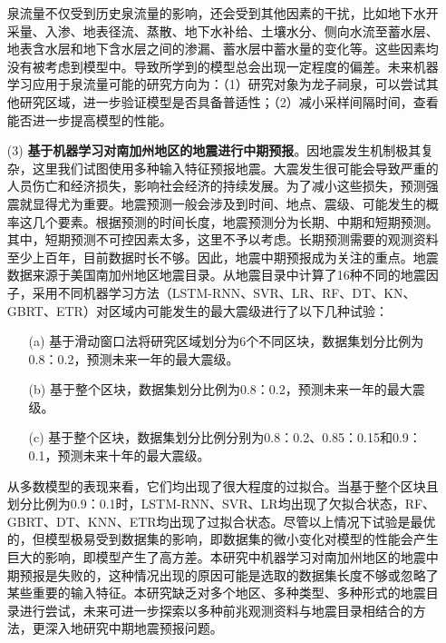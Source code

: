 \begin{enumerate}
  泉流量不仅受到历史泉流量的影响，还会受到其他因素的干扰，比如地下水开采量、入渗、地表径流、蒸散、地下水补给、土壤水分、侧向水流至蓄水层、地表含水层和地下含水层之间的渗漏、蓄水层中蓄水量的变化等。这些因素均没有被考虑到模型中。导致所学到的模型总会出现一定程度的偏差。未来机器学习应用于泉流量可能的研究方向为：（1）研究对象为龙子祠泉，可以尝试其他研究区域，进一步验证模型是否具备普适性；（2）减小采样间隔时间，查看能否进一步提高模型的性能。

  \item[(3)] \textbf{基于机器学习对南加州地区的地震进行中期预报}。因地震发生机制极其复杂，这里我们试图使用多种输入特征预报地震。大震发生很可能会导致严重的人员伤亡和经济损失，影响社会经济的持续发展。为了减小这些损失，预测强震就显得尤为重要。地震预测一般会涉及到时间、地点、震级、可能发生的概率这几个要素。根据预测的时间长度，地震预测分为长期、中期和短期预测。其中，短期预测不可控因素太多，这里不予以考虑。长期预测需要的观测资料至少上百年，目前数据时长不够。因此，地震中期预报成为关注的重点。地震数据来源于美国南加州地区地震目录。从地震目录中计算了16种不同的地震因子，采用不同机器学习方法（LSTM-RNN、SVR、LR、RF、DT、KN、GBRT、ETR）对区域内可能发生的最大震级进行了以下几种试验：
  \begin{itemize}
    \item[(a)] 基于滑动窗口法将研究区域划分为6个不同区块，数据集划分比例为0.8：0.2，预测未来一年的最大震级。
    \item[(b)] 基于整个区块，数据集划分比例为0.8：0.2，预测未来一年的最大震级。
    \item[(c)] 基于整个区块，数据集划分比例分别为0.8：0.2、0.85：0.15和0.9：0.1，预测未来十年的最大震级。
  \end{itemize}
    
  从多数模型的表现来看，它们均出现了很大程度的过拟合。当基于整个区块且划分比例为0.9：0.1时，LSTM-RNN、SVR、LR均出现了欠拟合状态，RF、GBRT、DT、KNN、ETR均出现了过拟合状态。尽管以上情况下试验是最优的，但模型极易受到数据集的影响，即数据集的微小变化对模型的性能会产生巨大的影响，即模型产生了高方差。本研究中机器学习对南加州地区的地震中期预报是失败的，这种情况出现的原因可能是选取的数据集长度不够或忽略了某些重要的输入特征。本研究缺乏对多个地区、多种类型、多种形式的地震目录进行尝试，未来可进一步探索以多种前兆观测资料与地震目录相结合的方法，更深入地研究中期地震预报问题。

\end{enumerate}